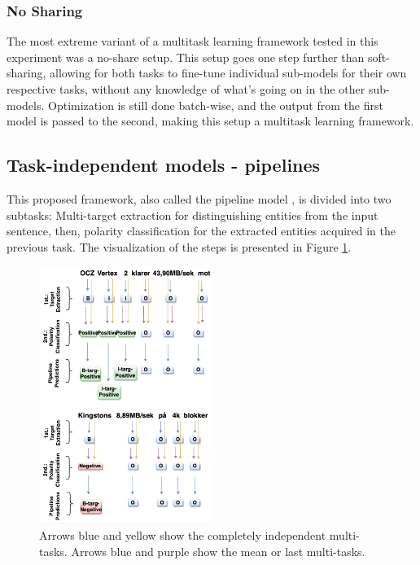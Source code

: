 \documentclass[11pt,a4paper]{article}
\begin{document}
\subsubsection{No Sharing}
\label{noshare}

The most extreme variant of a multitask learning framework tested in this experiment was a no-share setup. This setup goes one step further than soft-sharing, allowing for both tasks to fine-tune individual sub-models for their own respective tasks, without any knowledge of what's going on in the other sub-models. Optimization is still done batch-wise, and the output from the first model is passed to the second, making this setup a multitask learning framework. 

\subsection{Task-independent models - pipelines}
This proposed framework, also called the pipeline model \cite{hu-etal-2019-open}, is divided into two subtasks: Multi-target extraction for distinguishing entities from the input sentence, then, polarity classification for the extracted entities acquired in the previous task. The visualization of the steps is presented in Figure \ref{fig:no_share_mtl}.

\begin{figure}[!htb]
    \centering
    \includegraphics[width=0.5\textwidth]{pictures/TransformerMTL.png}
    \caption{Arrows blue and yellow show the completely independent multi-tasks. Arrows blue and purple show the mean or last multi-tasks.}
    \label{fig:no_share_mtl}
\end{figure}
\end{document}
